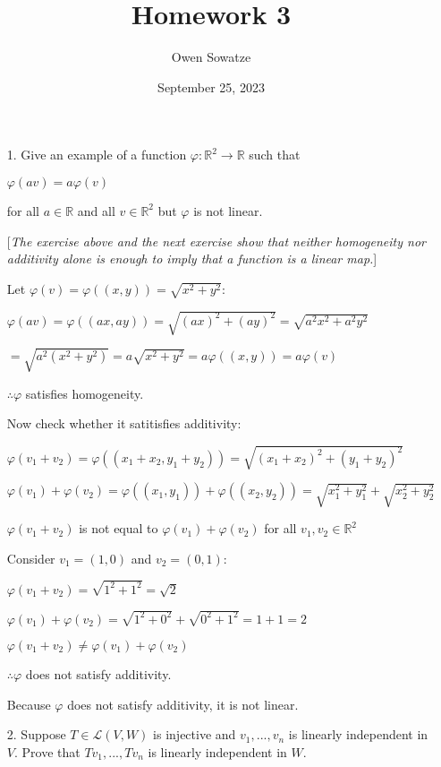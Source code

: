 \documentclass[fleqn]{article}
\title{Homework 3}
\author{Owen Sowatze}
\date{September 25, 2023}
\newcommand{\zerodisplayskip}{
	\setlength{\abovedisplayskip}{0pt}
	\setlength{\belowdisplayskip}{0pt}
	\setlength{\abovedisplayshortskip}{0pt}
	\setlength{\belowdisplayshortskip}{0pt}
	\setlength{\mathindent}{0pt}}
\begin{document}
	
	\zerodisplayskip
	\doublespacing
	\maketitle
	
	\begin{enumerate}[nolistsep]
		\item[1.] Give an example of a function $\varphi : \mathbb{R}^2 \rightarrow \mathbb{R}$ such that
		
		\centerline{$\varphi(av) = a\varphi(v)$}
		
		for all $a \in \mathbb{R}$ and all $v \in \mathbb{R}^2$ but $\varphi$ is not linear.
		
		[\textit{The exercise above and the next exercise show that neither homogeneity nor additivity alone is enough to imply that a function is a linear map.}]
		
		Let $\varphi(v) = \varphi((x,y)) = \sqrt{x^2+y^2}$:
		
		$\varphi(av) = \varphi((ax,ay)) = \sqrt{(ax)^2 + (ay)^2} = \sqrt{a^2x^2 + a^2y^2}$
		
		$ = \sqrt{a^2(x^2 + y^2)} = a\sqrt{x^2+y^2} = a\varphi((x,y)) = a\varphi(v)$
		
		$\therefore \varphi$ satisfies homogeneity.
		
		Now check whether it satitisfies additivity:
		
		$\varphi(v_1+v_2) = \varphi((x_1+x_2,y_1+y_2)) = \sqrt{(x_1+x_2)^2 + (y_1+y_2)^2}$
		
		$\varphi(v_1) + \varphi(v_2) = \varphi((x_1,y_1)) + \varphi((x_2,y_2)) = \sqrt{x_1^2+y_1^2} + \sqrt{x_2^2+y_2^2}$
		
		$\varphi(v_1+v_2)$ is not equal to $\varphi(v_1) + \varphi(v_2)$ for all $v_1, v_2 \in \mathbb{R}^2$
		
		Consider $v_1 = (1, 0)$ and $v_2 = (0, 1)$:
		
		$\varphi(v_1+v_2) = \sqrt{1^2 + 1^2} = \sqrt{2}$
		
		$\varphi(v_1) + \varphi(v_2) = \sqrt{1^2 + 0^2} + \sqrt{0^2 + 1^2} = 1 + 1 = 2$
		
		$\varphi(v_1+v_2) \neq \varphi(v_1) + \varphi(v_2)$
		
		$\therefore \varphi$ does not satisfy additivity.
		
		Because $\varphi$ does not satisfy additivity, it is not linear.
		
		\pagebreak
		\item[2.] Suppose $T \in \mathcal{L}(V,W)$ is injective and $v_1,...,v_n$ is linearly independent in $V$. Prove that $Tv_1,...,Tv_n$ is linearly independent in $W$.
		

\end{enumerate}
\end{document}
